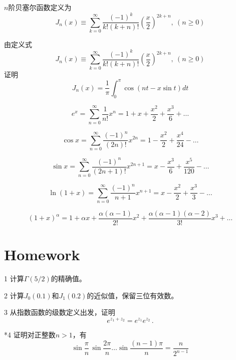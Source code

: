 \documentclass[CJK]{beamer}
\begin{document}
\begin{frame}
\bch
$n$阶贝塞尔函数定义为
\tbox
{$$J_n(x) \equiv \sum_{k=0}^\infty \frac{(-1)^k}{k!(k+n)!} \left(\frac{x}{2}\right)^{2k+n},\ (n\ge 0)$$ }
\ech
\end{frame}


\begin{frame}
\bch
由定义式
\tbox
{$$J_n(x) \equiv \sum_{k=0}^\infty \frac{(-1)^k}{k!(k+n)!} \left(\frac{x}{2}\right)^{2k+n},\ (n\ge 0)$$ }
证明
\tbox
{$$J_n(x) = \frac{1}{\pi} \int_0^\pi\cos\left(nt - x \sin t\right)dt$$}
\ech
\end{frame}



\begin{frame}
\bch
{}
\ech
\end{frame}

\begin{frame}
\bch
{\small
\bitem
\item{$$ e^x = \sum_{n=0}^{\infty} \frac{1}{n!} x^n = 1 + x + \frac{x^2}{2} +\frac{x^3}{6} + \ldots $$}
\item{$$ \cos x = \sum_{n=0}^{\infty} \frac{(-1)^n}{(2n)!} x^{2n} = 1 - \frac{x^2}{2} + \frac{x^4}{24} - \ldots $$}
\item{$$ \sin x = \sum_{n=0}^\infty \frac{(-1)^n}{(2n+1)!} x^{2n+1} = x - \frac{x^3}{6} + \frac{x^5}{120} - \ldots $$}
\item{$$\ln (1+x) = \sum_{n=0}^\infty \frac{(-1)^n}{n+1} x^{n+1}= x - \frac{x^2}{2} + \frac{x^3}{3} - \ldots$$}
\item{$$(1+x)^\alpha = 1+\alpha x + \frac{\alpha(\alpha-1)}{2!} x^2 + \frac{\alpha(\alpha-1)(\alpha-2)}{3!}x^3 + \ldots $$}
  \eitem
  }
\ech
\end{frame}



\section{Homework}

\begin{frame}
\bch
\bitem
\item[1]{计算$\Gamma(5/2)$的精确值。}
\item[2]{计算$J_0(0.1)$和$J_1(0.2)$的近似值，保留三位有效数。}
\item[3]{从指数函数的级数定义出发，证明$$ e^{z_1+z_2}= e^{z_1}e^{z_2}\, .$$}
\item[*4]{证明对正整数$n>1$，有
  $$\sin{\frac{\pi}{n}} \,  \sin{\frac{2\pi}{n}} \ldots  \sin{\frac{(n-1)\pi}{n}} = \frac{n}{2^{n-1}}$$
}
  
\eitem
\ech
\end{frame}
\end{document}
